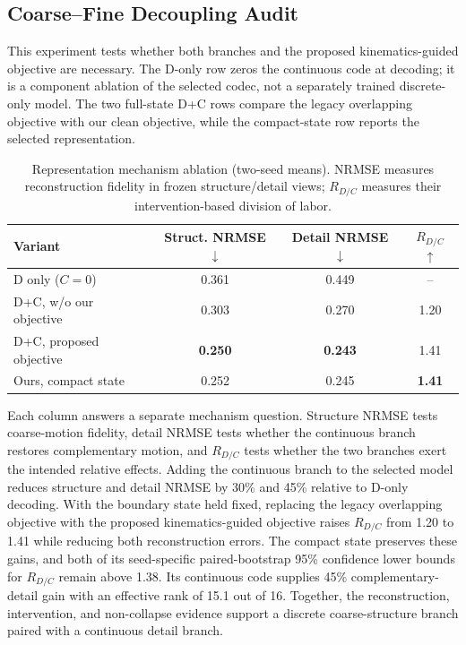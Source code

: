 \documentclass[conference]{IEEEtran}
\begin{document}
\subsection{Coarse--Fine Decoupling Audit}
This experiment tests whether both branches and the proposed kinematics-guided objective are necessary. The D-only row zeros the continuous code at decoding; it is a component ablation of the selected codec, not a separately trained discrete-only model. The two full-state D+C rows compare the legacy overlapping objective with our clean objective, while the compact-state row reports the selected representation.

\begin{table}[t]
\centering
\caption{Representation mechanism ablation (two-seed means). NRMSE measures reconstruction fidelity in frozen structure/detail views; $R_{D/C}$ measures their intervention-based division of labor.}
\label{tab:decoupling_audit}
\scriptsize
\setlength{\tabcolsep}{2pt}
\begin{tabular}{@{}lccc@{}}
\toprule
Variant & \shortstack{Struct.\\NRMSE $\downarrow$} & \shortstack{Detail\\NRMSE $\downarrow$} & $R_{D/C}$ $\uparrow$\\
\midrule
D only ($C=0$) & 0.361 & 0.449 & --\\
D+C, w/o our objective & 0.303 & 0.270 & 1.20\\
D+C, proposed objective & \textbf{0.250} & \textbf{0.243} & 1.41\\
Ours, compact state & 0.252 & 0.245 & \textbf{1.41}\\
\bottomrule
\end{tabular}
\end{table}

Each column answers a separate mechanism question. Structure NRMSE tests coarse-motion fidelity, detail NRMSE tests whether the continuous branch restores complementary motion, and $R_{D/C}$ tests whether the two branches exert the intended relative effects. Adding the continuous branch to the selected model reduces structure and detail NRMSE by 30\% and 45\% relative to D-only decoding. With the boundary state held fixed, replacing the legacy overlapping objective with the proposed kinematics-guided objective raises $R_{D/C}$ from 1.20 to 1.41 while reducing both reconstruction errors. The compact state preserves these gains, and both of its seed-specific paired-bootstrap 95\% confidence lower bounds for $R_{D/C}$ remain above 1.38. Its continuous code supplies 45\% complementary-detail gain with an effective rank of 15.1 out of 16. Together, the reconstruction, intervention, and non-collapse evidence support a discrete coarse-structure branch paired with a continuous detail branch.
\end{document}
